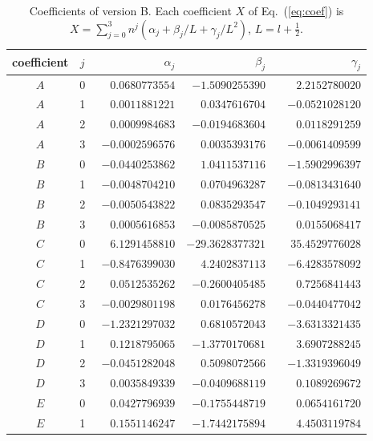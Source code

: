 \begin{table}[t]\centering\footnotesize
\caption{Coefficients of version B. Each coefficient $X$ of Eq.~(\ref{eq:coef}) is $X=\sum_{j=0}^{3} n^j(\alpha_j+\beta_j/L+\gamma_j/L^2)$, $L=l+\tfrac12$.}
\label{tab:coefB}
\begin{tabular}{cc rrr}\hline\hline
coefficient & $j$ & $\alpha_j$ & $\beta_j$ & $\gamma_j$ \\ \hline
$A$ & 0 & $\phantom{-}0.0680773554$ & $-1.5090255390$ & $\phantom{-}2.2152780020$ \\
$A$ & 1 & $\phantom{-}0.0011881221$ & $\phantom{-}0.0347616704$ & $-0.0521028120$ \\
$A$ & 2 & $\phantom{-}0.0009984683$ & $-0.0194683604$ & $\phantom{-}0.0118291259$ \\
$A$ & 3 & $-0.0002596576$ & $\phantom{-}0.0035393176$ & $-0.0061409599$ \\
$B$ & 0 & $-0.0440253862$ & $\phantom{-}1.0411537116$ & $-1.5902996397$ \\
$B$ & 1 & $-0.0048704210$ & $\phantom{-}0.0704963287$ & $-0.0813431640$ \\
$B$ & 2 & $-0.0050543822$ & $\phantom{-}0.0835293547$ & $-0.1049293141$ \\
$B$ & 3 & $\phantom{-}0.0005616853$ & $-0.0085870525$ & $\phantom{-}0.0155068417$ \\
$C$ & 0 & $\phantom{-}6.1291458810$ & $-29.3628377321$ & $\phantom{-}35.4529776028$ \\
$C$ & 1 & $-0.8476399030$ & $\phantom{-}4.2402837113$ & $-6.4283578092$ \\
$C$ & 2 & $\phantom{-}0.0512535262$ & $-0.2600405485$ & $\phantom{-}0.7256841443$ \\
$C$ & 3 & $-0.0029801198$ & $\phantom{-}0.0176456278$ & $-0.0440477042$ \\
\hline
$D$ & 0 & $-1.2321297032$ & $\phantom{-}0.6810572043$ & $-3.6313321435$ \\
$D$ & 1 & $\phantom{-}0.1218795065$ & $-1.3770170681$ & $\phantom{-}3.6907288245$ \\
$D$ & 2 & $-0.0451282048$ & $\phantom{-}0.5098072566$ & $-1.3319396049$ \\
$D$ & 3 & $\phantom{-}0.0035849339$ & $-0.0409688119$ & $\phantom{-}0.1089269672$ \\
$E$ & 0 & $\phantom{-}0.0427796939$ & $-0.1755448719$ & $\phantom{-}0.0654161720$ \\
$E$ & 1 & $\phantom{-}0.1551146247$ & $-1.7442175894$ & $\phantom{-}4.4503119784$ \\

\end{tabular}
\end{table}
